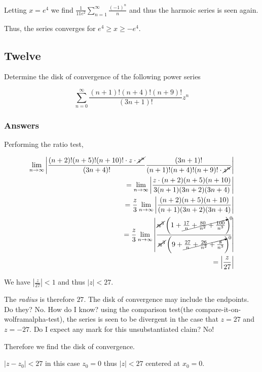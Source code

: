 \documentclass{article}
\begin{document}
Letting $x = e^4$ we find $\frac{1}{11e^2} \sum_{n=1}^{\infty} \frac{(-1)^n}{n}$ and thus the harmoic series is seen again.

Thus, the series converges for $e^4 \geq x \geq -e^4$.
\par

\subsection*{Twelve}

Determine the disk of convergence of the following power series

\begin{equation}\label{c12}
\sum_{n=0}^{\infty} \frac {(n+1)!(n+4)!(n+9)!}{(3n+1)!}z^n
\end{equation}

\subsubsection*{Answers}

Performing the ratio test,

\begin{align*}
\lim_{n\to\infty}\left| \frac{(n+2)!(n+5)!(n+10)! \cdot z \cdot \cancel{z^n}}{(3n+4)!} \frac{(3n+1)!}{(n+1)!(n+4)!(n+9)! \cdot \cancel{z^n}} \right| \\
= \lim_{n\to\infty}\left| \frac{z\cdot (n+2)(n+5)(n+10)}{3(n+1)(3n+2)(3n+4)}\right| \\
= \frac{z}{3} \lim_{n\to\infty}\left| \frac{(n+2)(n+5)(n+10)}{(n+1)(3n+2)(3n+4)} \right|\\
= \frac{z}{3} \lim_{n\to\infty}\left| \frac{\cancel{n^3}\left(1+\cancelto{0}{\frac{17}{n}+\frac{80}{n^2}+\frac{100}{n^3}} \right) }{\cancel{n^3}\left(9+\cancelto{0}{\frac{27}{n}+\frac{26}{n^2}+\frac{8}{n^3}}\right)}\right| \\
= \left|\frac{z}{27}\right|
\end{align*}

We have $\left|\frac{z}{27}\right| < 1$ and thus $\left|z\right| < 27$.

The \textit{radius} is therefore $27$.
The disk of convergence may include the endpoints. Do they? No. How do I know? using the comparison test(the compare-it-on-wolframalpha-test), the series is seen to be divergent in the case that $z = 27$ and $z = -27$. Do I expect any mark for this unsubstantiated claim? No!

Therefore we find the disk of convergence. 

$ |z - z_0| < 27 $ in this case $z_0 = 0$ thus $|z| <27$ centered at $x_0=0$.
\par
\end{document}
